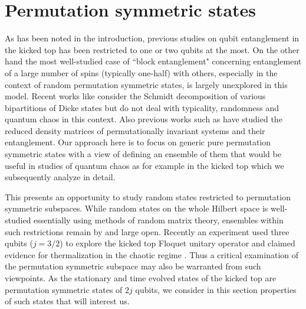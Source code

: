 \documentclass[pre,aps,showpacs,showkeys,twocolumn]{revtex4-1}
\theoremstyle{definition}
\theoremstyle{remark}
\begin{document}
\section{Permutation symmetric states}
As has been noted in the introduction, previous studies on qubit entanglement in the kicked top has been restricted to one or two qubits at the most. On the other hand the most well-studied case of ``block entanglement" concerning entanglement of a large number of spins (typically one-half) with others, especially in the context of random permutation symmetric states, is largely unexplored in this model. Recent works like \cite{moreno2018all} consider the Schmidt decomposition of various bipartitions of Dicke states but do not deal with typicality, randomness and quantum chaos in this context. Also previous works such as \cite{popkov2012reduced,markham2011entanglement, devi2012majorana, bohnet2016partial, wang2002pairwise, baguette2014multiqubit} have studied the reduced density matrices of permutationally invariant systems and their entanglement. Our approach here is to focus on generic pure permutation symmetric states with a view of defining an ensemble of them that would be useful in studies of quantum chaos as for example in the kicked top which we subsequently analyze in detail.

This presents an opportunity to study random states restricted to permutation symmetric subspaces. While random states on the whole Hilbert space is well-studied essentially using methods of random matrix theory, ensembles within such  restrictions remain by and large open. Recently an experiment used three qubits ($j = 3/2$) to explore the kicked top Floquet unitary operator and claimed evidence for thermalization in the chaotic regime \cite{Neill16}. Thus a critical examination of the permutation symmetric subspace may also be warranted from such viewpoints. As the stationary and time evolved states of the kicked top are permutation symmetric states of $2j$ qubits, we consider in this section properties of such states that will interest us.
\end{document}
